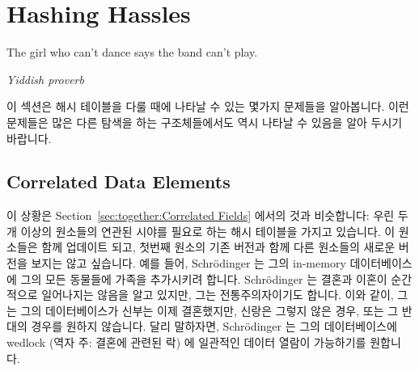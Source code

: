 
\section{Hashing Hassles}
\label{sec:together:Hashing Hassles}
%
\epigraph{The girl who can't dance says the band can't play.}
	 {\emph{Yiddish proverb}}

이 섹션은 해시 테이블을 다룰 때에 나타날 수 있는 몇가지 문제들을 알아봅니다.
이런 문제들은 많은 다른 탐색을 하는 구조체들에서도 역시 나타날 수 있음을 알아
두시기 바랍니다.
\iffalse

This section looks at some issues that can arise when dealing with
hash tables.
Please note that these issues also apply to many other search structures.
\fi

\subsection{Correlated Data Elements}
\label{sec:together:Correlated Data Elements}

이 상황은
Section~\ref{sec:together:Correlated Fields} 에서의 것과 비슷합니다:
우린 두개 이상의 원소들의 연관된 시야를 필요로 하는 해시 테이블을 가지고
있습니다.
이 원소들은 함께 업데이트 되고, 첫번째 원소의 기존 버전과 함께 다른 원소들의
새로운 버전을 보지는 않고 싶습니다.
예를 들어, Schr\"odinger 는 그의 in-memory 데이터베이스에 그의 모든 동물들에
가족을 추가시키려 합니다.
Schr\"odinger 는 결혼과 이혼이 순간적으로 일어나지는 않음을 알고 있지만, 그는
전통주의자이기도 합니다.
이와 같이, 그는 그의 데이터베이스가 신부는 이제 결혼했지만, 신랑은 그렇지 않은
경우, 또는 그 반대의 경우를 원하지 않습니다.
달리 말하자면, Schr\"odinger 는 그의 데이터베이스에 wedlock (역자 주: 결혼에
관련된 락) 에 일관적인 데이터 열람이 가능하기를 원합니다.
\iffalse

This situation is analogous to that in
Section~\ref{sec:together:Correlated Fields}:
We have a hash table where we need correlated views of two or more of
the elements.
These elements are updated together, and we do not want to see an old
version of the first element along with new versions of the other
elements.
For example, Schr\"odinger decided to add his extended family to his
in-memory database along with all his animals.
Although Schr\"odinger understands that marriages and divorces do not
happen instantaneously, he is also a traditionalist.
As such, he absolutely does not want his database ever to show that the
bride is now married, but the groom is not, and vice versa.
In other words, Schr\"odinger wants to be able to carry out a
wedlock-consistent traversal of his database.
\fi

